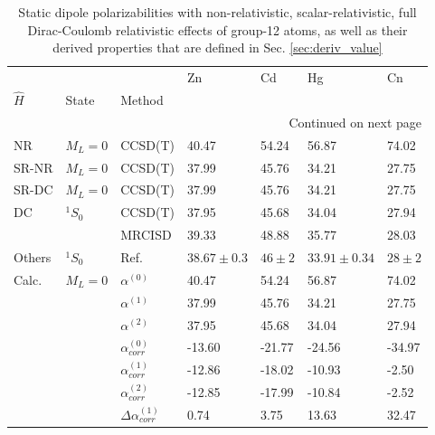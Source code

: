 \begin{longtable}{lllllll}
\caption{Static dipole polarizabilities with non-relativistic, scalar-relativistic, full Dirac-Coulomb relativistic effects of group-12 atoms, as well as their derived properties that are defined in Sec. \ref{sec:deriv_value}}\label{tab:dipole_group_12}\\
\toprule
      &         &                                    &             Zn &        Cd &              Hg &        Cn \\
$\hat{H}$ & State & Method &                &           &                 &           \\
\midrule
\endhead
\midrule
\multicolumn{7}{r}{{Continued on next page}} \\
\midrule
\endfoot

\bottomrule
\endlastfoot
NR & $M_L=0$ & CCSD(T) &          40.47 &     54.24 &           56.87 &     74.02 \\
SR-NR & $M_L=0$ & CCSD(T) &          37.99 &     45.76 &           34.21 &     27.75 \\
SR-DC & $M_L=0$ & CCSD(T) &          37.99 &     45.76 &           34.21 &     27.75 \\
DC & $^1S_0$ & CCSD(T) &          37.95 &     45.68 &           34.04 &     27.94 \\
      &         & MRCISD &          39.33 &     48.88 &           35.77 &     28.03 \\
Others & $^1S_0$ & Ref. \cite{Schwerdtfeger2019} &  $38.67\pm0.3$ &  $46\pm2$ &  $33.91\pm0.34$ &  $28\pm2$ \\
Calc. & $M_L=0$ & $\alpha^{(0)}$ &          40.47 &     54.24 &           56.87 &     74.02 \\
      &         & $\alpha^{(1)}$ &          37.99 &     45.76 &           34.21 &     27.75 \\
      &         & $\alpha^{(2)}$ &          37.95 &     45.68 &           34.04 &     27.94 \\
      &         & $\alpha_{corr}^{(0)}$ &         -13.60 &    -21.77 &          -24.56 &    -34.97 \\
      &         & $\alpha_{corr}^{(1)}$ &         -12.86 &    -18.02 &          -10.93 &     -2.50 \\
      &         & $\alpha_{corr}^{(2)}$ &         -12.85 &    -17.99 &          -10.84 &     -2.52 \\
      &         & $\Delta \alpha_{corr}^{(\text{1})}$ &           0.74 &      3.75 &           13.63 &     32.47 \\

\end{longtable}
